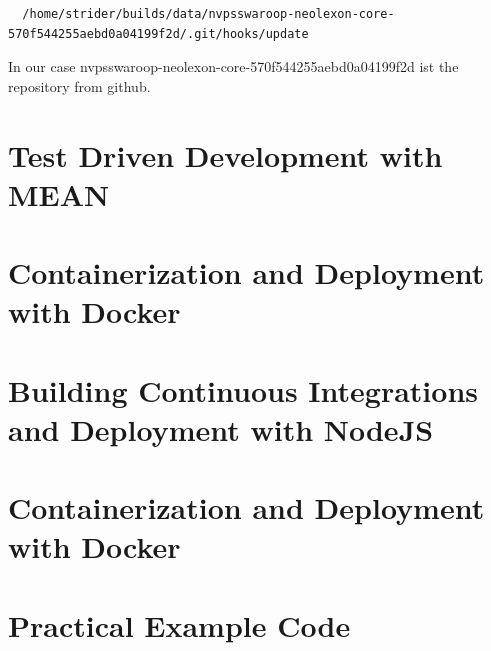\begin{lstlisting}
  /home/strider/builds/data/nvpsswaroop-neolexon-core-570f544255aebd0a04199f2d/.git/hooks/update
\end{lstlisting}

In our case nvpsswaroop-neolexon-core-570f544255aebd0a04199f2d ist the repository from github.



\newpage
\section{Test Driven Development with MEAN}
\label{section:Test Driven Development with MEAN}


\newpage

\section{Containerization and Deployment with Docker}
\label{section:Containerization and Deployment with Docker}


\newpage

\section{Building Continuous Integrations and Deployment with NodeJS}
\label{section:Building Continuous Integrations and Deployment with NodeJS}


\newpage

\section{Containerization and Deployment with Docker}
\label{section:Containerization and Deployment with Docker}


\newpage

\section{Practical Example Code}
\label{section:Practical Example Code}


\newpage








